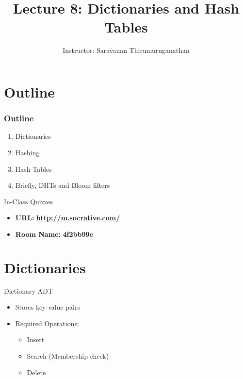\documentclass{beamer}
\title[Saravanan Thirumuruganathan] 
{Lecture 8: Dictionaries and Hash Tables}
\author[CSE 5311] 
{Instructor: Saravanan Thirumuruganathan}
\date[]
\begin{document}
\begin{frame}
  \titlepage
\end{frame}


\section{Outline}

\begin{frame}
\frametitle {Outline}
\begin{enumerate}
\item Dictionaries
\item Hashing
\item Hash Tables
\item Briefly, DHTs and Bloom filters
\end{enumerate}
\end{frame}

\begin{frame}{In-Class Quizzes}
\begin{itemize}
\item {\Large {\bf URL:}} {\LARGE \bf \url{http://m.socrative.com/}} 
\item {\Large {\bf Room Name:} {\LARGE \bf 4f2bb99e}}
\end{itemize}
\end{frame}

\section{Dictionaries}

\begin{frame}{Dictionary ADT}
    \begin{itemize}
        \item Stores key-value pairs
        \item Required Operations:
        \begin{itemize}
            \item Insert
            \item Search (Membership check)
            \item Delete
        \end{itemize}
    \end{itemize}
\end{frame}
\end{document}

